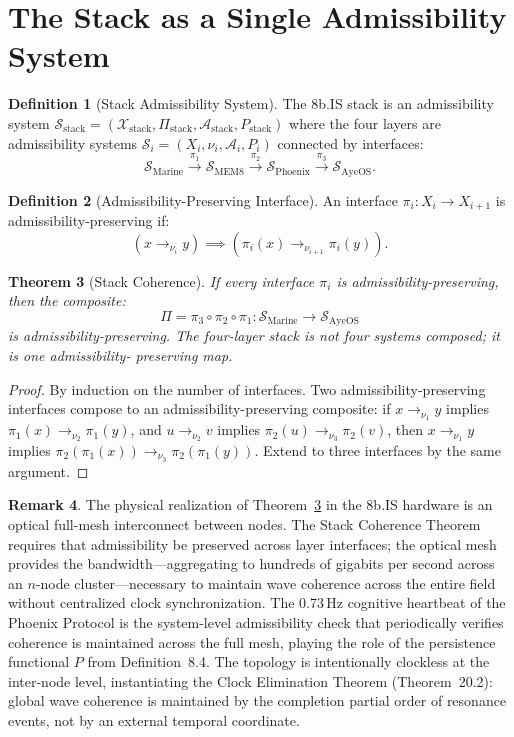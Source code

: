 \documentclass[12pt, oneside]{book}
\theoremstyle{flyxion}
\newtheorem{theorem}{Theorem}[chapter]
\theoremstyle{definition}
\newtheorem{definition}[theorem]{Definition}
\newtheorem{remark}[theorem]{Remark}
\begin{document}
\section{The Stack as a Single Admissibility System}

\begin{definition}[Stack Admissibility System]
The 8b.IS stack is an admissibility system
$\mathcal{S}_\mathrm{stack} = (\mathcal{X}_\mathrm{stack},
\Pi_\mathrm{stack}, \mathcal{A}_\mathrm{stack},
P_\mathrm{stack})$ where the four layers are admissibility
systems $\mathcal{S}_i = (X_i, \nu_i, \mathcal{A}_i, P_i)$
connected by interfaces:
\[
\mathcal{S}_\mathrm{Marine} \xrightarrow{\pi_1}
\mathcal{S}_\mathrm{MEM8} \xrightarrow{\pi_2}
\mathcal{S}_\mathrm{Phoenix} \xrightarrow{\pi_3}
\mathcal{S}_\mathrm{AyeOS}.
\]
\end{definition}

\begin{definition}[Admissibility-Preserving Interface]\label{def:adm_interface}
An interface $\pi_i : X_i \to X_{i+1}$ is
admissibility-preserving if:
\[
(x \to_{\nu_i} y) \implies (\pi_i(x) \to_{\nu_{i+1}} \pi_i(y)).
\]
\end{definition}

\begin{theorem}[Stack Coherence]
\label{thm:stack_coherence}
If every interface $\pi_i$ is admissibility-preserving,
then the composite:
\[
\Pi = \pi_3 \circ \pi_2 \circ \pi_1 :
\mathcal{S}_\mathrm{Marine} \to \mathcal{S}_\mathrm{AyeOS}
\]
is admissibility-preserving. The four-layer stack is
not four systems composed; it is one admissibility-
preserving map.
\end{theorem}

\begin{proof}
By induction on the number of interfaces. Two
admissibility-preserving interfaces compose to an
admissibility-preserving composite: if $x \to_{\nu_1}
y$ implies $\pi_1(x) \to_{\nu_2} \pi_1(y)$, and
$u \to_{\nu_2} v$ implies $\pi_2(u) \to_{\nu_3}
\pi_2(v)$, then $x \to_{\nu_1} y$ implies
$\pi_2(\pi_1(x)) \to_{\nu_3} \pi_2(\pi_1(y))$. Extend
to three interfaces by the same argument.
\end{proof}

\begin{remark}
The physical realization of Theorem~\ref{thm:stack_coherence}
in the 8b.IS hardware is an optical full-mesh
interconnect between nodes. The Stack Coherence
Theorem requires that admissibility be preserved
across layer interfaces; the optical mesh provides
the bandwidth---aggregating to hundreds of gigabits
per second across an $n$-node cluster---necessary
to maintain wave coherence across the entire field
without centralized clock synchronization. The
0.73\,Hz cognitive heartbeat of the Phoenix Protocol
is the system-level admissibility check that
periodically verifies coherence is maintained across
the full mesh, playing the role of the persistence
functional $P$ from Definition~8.4. The topology is
intentionally clockless at the inter-node level,
instantiating the Clock Elimination Theorem
(Theorem~20.2): global wave coherence is maintained
by the completion partial order of resonance events,
not by an external temporal coordinate.
\end{remark}
\end{document}
